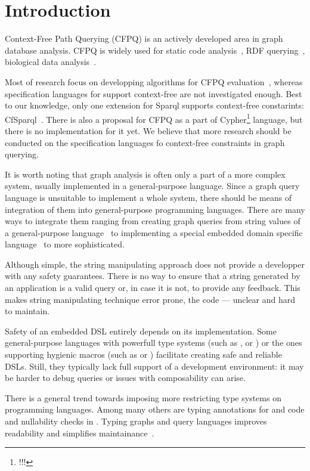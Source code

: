 \section{Introduction}

Context-Free Path Querying (CFPQ) is an actively developed area in graph database analysis.
CFPQ is widely used for static code analysis~\cite{!!!}, RDF querying~\cite{!!!}, biological data analysis~\cite{!!!}.

Most of research focus on developping algorithms for CFPQ evaluation~\cite{!!!}, whereas specification languages for support context-free are not investigated enough.
Best to our knowledge, only one extension for Sparql supports context-free constarints: CfSparql~\cite{!!!}.
There is also a proposal for CFPQ as a part of Cypher\footnote{!!!} language, but there is no implementation for it yet.
We believe that more research should be conducted on the specification languages fo context-free constraints in graph querying.

It is worth noting that graph analysis is often only a part of a more complex system, usually implemented in a general-purpose language. 
Since a graph query language is unsuitable to implement a whole system, there should be means of integration of them into general-purpose programming languages.
There are many ways to integrate them ranging from creating graph queries from string values of a general-purpose language~\cite{!!!} to implementing a special embedded domain specific language~\cite{!!!} to more sophisticated.

Although simple, the string manipulating approach does not provide a developper with any safety guarantees.
There is no way to ensure that a string generated by an application is a valid query or, in case it is not, to provide any feedback.
This makes string manipulating technique error prone, the code --- unclear and hard to maintain.

Safety of an embedded DSL entirely depends on its implementation. 
Some general-purpose languages with powerfull type systems (such as \haskell{}, \ocaml{} or \scala{}) or the ones supporting hygienic macros (such as \scheme{} or \rust{}) facilitate creating safe and reliable DSLs. 
Still, they typically lack full support of a development environment: it may be harder to debug queries or issues with composability can arise.

There is a general trend towards imposing more restricting type systems on programming languages. 
Among many others are typing annotations for \python{} and \typescript{} code and nullability checks in \kotlin{}.
Typing graphs and query languages improves  readability and simplifies maintainance~\cite{10.1145/2076623.2076653}.


